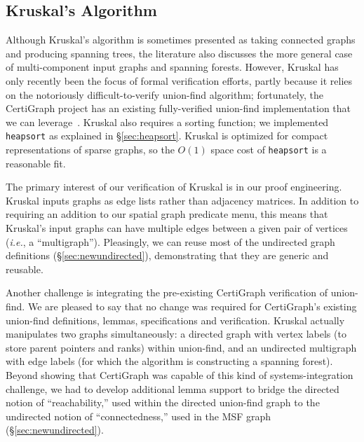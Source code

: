 \vspace*{-0.5em}
\subsection{Kruskal's Algorithm}
\label{sec:kruskal}
\vspace*{-0.25em}

Although Kruskal's algorithm is sometimes presented as taking connected graphs and producing spanning trees, the literature also discusses the more general case of multi-component input graphs and spanning forests.  However, Kruskal has only recently been the focus of formal verification efforts, partly because it relies on the notoriously difficult-to-verify union-find algorithm; fortunately, the CertiGraph project has an existing fully-verified union-find implementation that we can leverage~\cite{DBLP:journals/pacmpl/WangCMH19}.  Kruskal also requires a sorting function; we implemented \texttt{heapsort} as explained in \S\ref{sec:heapsort}.  Kruskal is optimized for compact representations of sparse graphs, so the $O(1)$ space cost of \texttt{heapsort} is a reasonable fit.  %

The primary interest of our verification of Kruskal is in our proof engineering.  Kruskal inputs graphs as edge lists rather than adjacency matrices.  In addition to requiring an addition to our spatial graph predicate menu, this means that Kruskal's input graphs can have multiple edges between a given pair of vertices (\emph{i.e.}, a ``multigraph'').  Pleasingly, we can reuse most of the undirected graph definitions (\S\ref{sec:newundirected}), demonstrating that they are generic and reusable.

Another challenge is integrating the pre-existing CertiGraph verification of union-find.  We are pleased to say that no change was required for CertiGraph's existing union-find definitions, lemmas, specifications and verification.  Kruskal actually manipulates two graphs simultaneously: a directed graph with vertex labels (to store parent pointers and ranks) within union-find, and an undirected multigraph with edge labels (for which the algorithm is constructing a spanning forest).  Beyond showing that CertiGraph was capable of this kind of systems-integration challenge, we had to develop additional lemma support to bridge the directed notion of ``reachability,'' used within the directed union-find graph to the undirected notion of ``connectedness,'' used in the MSF graph (\S\ref{sec:newundirected}).

